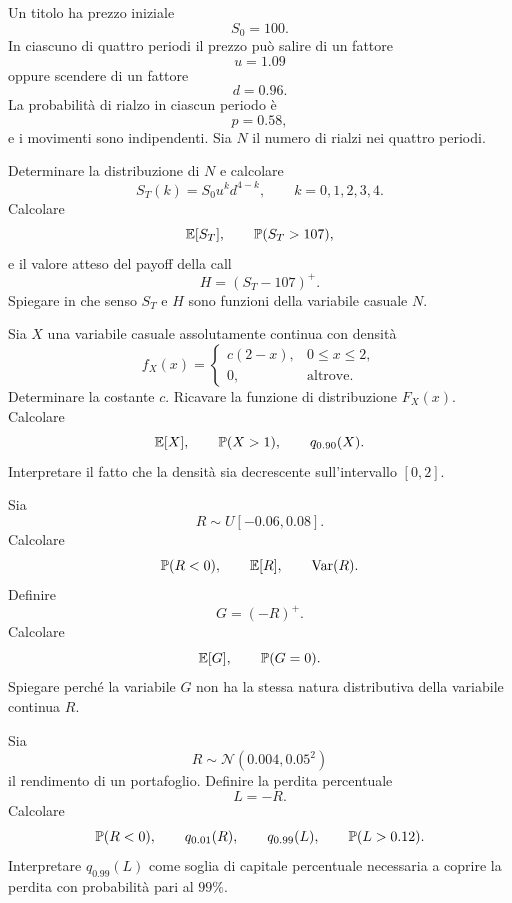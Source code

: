 \begin{exercise}
\label{ex:cap2-prop-binomiale-quattro-periodi}

Un titolo ha prezzo iniziale
\[
S_0=100.
\]
In ciascuno di quattro periodi il prezzo pu\`{o} salire di un fattore
\[
u=1.09
\]
oppure scendere di un fattore
\[
d=0.96.
\]
La probabilit\`{a} di rialzo in ciascun periodo \`{e}
\[
p=0.58,
\]
e i movimenti sono indipendenti. Sia $N$ il numero di rialzi nei quattro periodi.

Determinare la distribuzione di $N$ e calcolare
\[
S_T(k)=S_0u^k d^{4-k},
\qquad
k=0,1,2,3,4.
\]
Calcolare
\[
\mathbb{E}[S_T],
\qquad
\mathbb{P}(S_T>107),
\]
e il valore atteso del payoff della call
\[
H=(S_T-107)^+.
\]
Spiegare in che senso $S_T$ e $H$ sono funzioni della variabile casuale $N$.

\end{exercise}

\begin{exercise}
\label{ex:cap2-prop-densita-lineare}

Sia $X$ una variabile casuale assolutamente continua con densit\`{a}
\[
f_X(x)=
\begin{cases}
c(2-x), & 0\leq x\leq 2,\\
0, & \mbox{altrove}.
\end{cases}
\]
Determinare la costante $c$. Ricavare la funzione di distribuzione $F_X(x)$.
Calcolare
\[
\mathbb{E}[X],
\qquad
\mathbb{P}(X>1),
\qquad
q_{0.90}(X).
\]
Interpretare il fatto che la densit\`{a} sia decrescente sull'intervallo
$[0,2]$.

\end{exercise}

\begin{exercise}
\label{ex:cap2-prop-rendimento-uniforme}
\par\smallskip

Sia
\[
R\sim U[-0.06,0.08].
\]
Calcolare
\[
\mathbb{P}(R<0),
\qquad
\mathbb{E}[R],
\qquad
\operatorname{Var}(R).
\]
Definire
\[
G=(-R)^+.
\]
Calcolare
\[
\mathbb{E}[G],
\qquad
\mathbb{P}(G=0).
\]
Spiegare perch\'{e} la variabile $G$ non ha la stessa natura distributiva della
variabile continua $R$.

\end{exercise}

\begin{exercise}
\label{ex:cap2-prop-rendimento-normale}
\par\smallskip

Sia
\[
R\sim\mathcal{N}(0.004,0.05^2)
\]
il rendimento di un portafoglio. Definire la perdita percentuale
\[
L=-R.
\]
Calcolare
\[
\mathbb{P}(R<0),
\qquad
q_{0.01}(R),
\qquad
q_{0.99}(L),
\qquad
\mathbb{P}(L>0.12).
\]
Interpretare $q_{0.99}(L)$ come soglia di capitale percentuale necessaria a
coprire la perdita con probabilit\`{a} pari al $99\%$.

\end{exercise}

